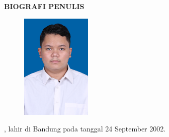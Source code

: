 \begin{center}
  \Large
  \textbf{BIOGRAFI PENULIS}
\end{center}


\vspace{2ex}

\begin{figure}
  \centering
  \vspace{-3ex}
  \includegraphics[width=0.3\textwidth]{gambar/evan.jpg}
  \vspace{-4ex}
\end{figure}

\name{}, lahir di Bandung pada tanggal 24 September 2002. 

\lipsum[2]
